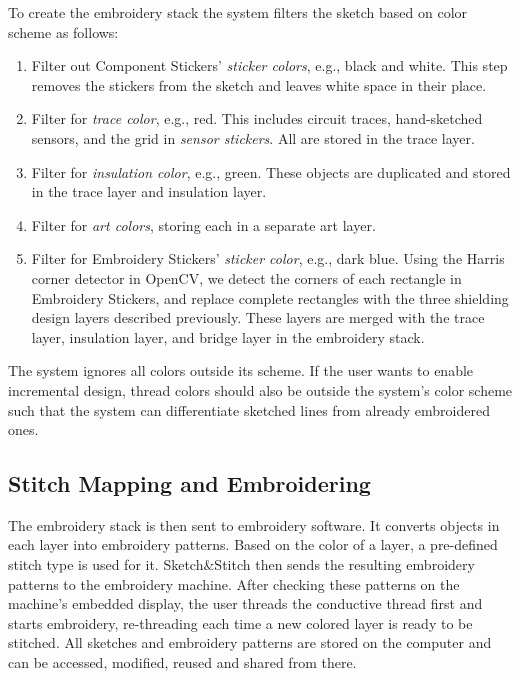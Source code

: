 To create the embroidery stack the system filters the sketch based on color scheme as follows: 
\begin{enumerate}
    \item Filter out Component Stickers' \textit{sticker colors}, e.g., black and white. This step removes the stickers from the sketch and leaves white space in their place.
    \item Filter for \textit{trace color}, e.g., red. This includes circuit traces, hand-sketched sensors, and the grid in \textit{sensor stickers}. All are stored in the trace layer.
    \item Filter for \textit{insulation color}, e.g., green. These objects are duplicated and stored in the trace layer and insulation layer.
    \item Filter for \textit{art colors}, storing each in a separate art layer.
    \item Filter for Embroidery Stickers' \textit{sticker color}, e.g., dark blue. Using the Harris corner detector in OpenCV, we detect the corners of each rectangle in Embroidery Stickers, and replace complete rectangles with the three shielding design layers described previously. These layers are merged with the trace layer, insulation layer, and bridge layer in the embroidery stack.
\end{enumerate}
 


The system ignores all colors outside its scheme. If the user wants to enable incremental design, thread colors should also be outside the system's color scheme 
such that the system can differentiate sketched lines from already embroidered ones. 

\subsection{Stitch Mapping and Embroidering}
The embroidery stack is then sent to embroidery software. It converts objects in each layer into embroidery patterns. Based on the color of a layer, a pre-defined stitch type is used for it. Sketch\&Stitch then sends the resulting embroidery patterns to the embroidery machine. After checking these patterns on the machine's embedded display, the user threads the conductive thread first and starts embroidery, re-threading each time a new colored layer is ready to be stitched. All sketches and embroidery patterns are stored on the computer and can be accessed, modified, reused and shared from there.


